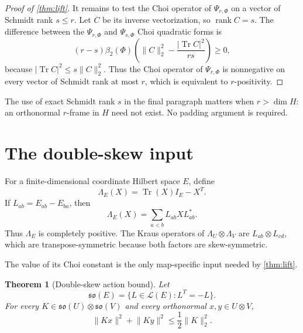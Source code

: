 \documentclass[11pt,reqno]{amsart}
\newtheorem{theorem}{Theorem}[section]
\theoremstyle{remark}
\DeclareMathOperator{\Tr}{Tr}
\DeclareMathOperator{\rank}{rank}
\newcommand{\cL}{\mathcal L}
\newcommand{\norm}[1]{\lVert #1\rVert}
\newcommand{\abs}[1]{\lvert #1\rvert}
\begin{document}
\begin{proof}[Proof of \cref{thm:lift}]
It remains to test the Choi operator of $\Psi_{r,\Phi}$ on a vector of Schmidt rank
$s\le r$.  Let $C$ be its inverse vectorization, so $\rank C=s$.  The
difference between the $\Psi_{r,\Phi}$ and $\Psi_{s,\Phi}$ Choi quadratic
forms is
\begin{equation}
\label{eq:rank-extension}
  (r-s)\beta_2(\Phi)
  \left(\norm C_2^2-\frac{\abs{\Tr C}^2}{rs}\right)\ge0,
\end{equation}
because $\abs{\Tr C}^2\le s\norm C_2^2$.  Thus the Choi operator of
$\Psi_{r,\Phi}$ is nonnegative on every vector of Schmidt rank at most
$r$, which is equivalent to $r$-positivity.
\end{proof}

The use of exact Schmidt rank $s$ in the final paragraph matters when
$r>\dim H$: an orthonormal $r$-frame in $H$ need not exist.  No padding
argument is required.

\section{The double-skew input}
\label{sec:double-skew}

For a finite-dimensional coordinate Hilbert space $E$, define
\[
  \Lambda_E(X)=\Tr(X)I_E-X^T.
\]
If $L_{ab}=E_{ab}-E_{ba}$, then
\begin{equation}
\label{eq:lambda-kraus}
  \Lambda_E(X)=\sum_{a<b}L_{ab}XL_{ab}^*.
\end{equation}
Thus $\Lambda_E$ is completely positive.  The Kraus operators of
$\Lambda_U\otimes\Lambda_V$ are $L_{ab}\otimes L_{cd}$, which are
transpose-symmetric because both factors are skew-symmetric.

The value of its Choi constant is the only map-specific input needed by
\cref{thm:lift}.

\begin{theorem}[Double-skew action bound]
\label{thm:double-skew}
Let
\[
  \mathfrak{so}(E)=\{L\in\cL(E):L^T=-L\}.
\]
For every
$K\in\mathfrak{so}(U)\otimes\mathfrak{so}(V)$ and every orthonormal
$x,y\in U\otimes V$,
\begin{equation}
\label{eq:double-skew}
  \norm{Kx}^2+\norm{Ky}^2
  \le\frac12\norm K_2^2.
\end{equation}
\end{theorem}
\end{document}
